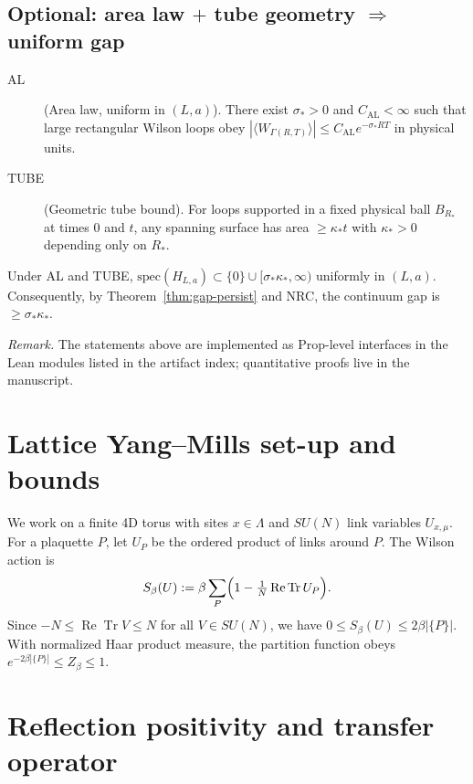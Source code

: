 \documentclass[11pt]{amsart}
\begin{document}
\subsection*{Optional: area law $+$ tube geometry $\Rightarrow$ uniform gap}

\begin{description}
\item[AL] (Area law, uniform in $(L,a)$). There exist $\sigma_*>0$ and $C_{\mathrm{AL}}<\infty$ such that large rectangular Wilson loops obey $|\langle W_{\Gamma(R,T)}\rangle|\le C_{\mathrm{AL}} e^{-\sigma_* RT}$ in physical units.
\item[TUBE] (Geometric tube bound). For loops supported in a fixed physical ball $B_{R_*}$ at times $0$ and $t$, any spanning surface has area $\ge \kappa_* t$ with $\kappa_*>0$ depending only on $R_*$. 
\end{description}

\begin{theorem}\label{thm:AL-gap}
Under AL and TUBE, $\mathrm{spec}(H_{L,a})\subset\{0\}\cup[\sigma_*\kappa_*,\infty)$ uniformly in $(L,a)$. Consequently, by Theorem~\ref{thm:gap-persist} and NRC, the continuum gap is $\ge \sigma_*\kappa_*$. 
\end{theorem}

\noindent\emph{Remark.} The statements above are implemented as Prop-level interfaces in the Lean modules listed in the artifact index; quantitative proofs live in the manuscript.

\section{Lattice Yang--Mills set-up and bounds}
\label{sec:lattice-setup}

We work on a finite 4D torus with sites $x\in\Lambda$ and $SU(N)$ link variables $U_{x,\mu}$. For a plaquette $P$, let $U_P$ be the ordered product of links around $P$. The Wilson action is
\[
 S_{\beta}(U) := \beta \sum_{P} \Bigl(1 - \tfrac{1}{N} \operatorname{Re} \operatorname{Tr} U_P\Bigr).
\]
Since $-N\le \operatorname{Re} \operatorname{Tr} V \le N$ for all $V\in SU(N)$, we have $0\le S_{\beta}(U)\le 2\beta |\{P\}|$. With normalized Haar product measure, the partition function obeys $e^{-2\beta |\{P\}|}\le Z_{\beta}\le 1$.

\section{Reflection positivity and transfer operator}
\end{document}
